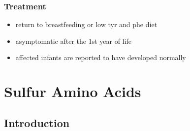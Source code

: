 \documentclass{scrartcl}
\begin{document}
\subsubsection{Treatment}
\label{sec:org24613f5}
\begin{itemize}
\item return to breastfeeding or low tyr and phe diet
\item asymptomatic after the 1st year of life
\item affected infants are reported to have developed normally
\end{itemize}

\section{Sulfur Amino Acids}
\label{sec:org25ece79}
\subsection{Introduction}
\label{sec:orgcdeedc2}
\end{document}
